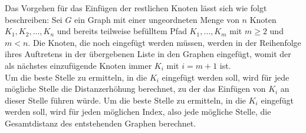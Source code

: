 
Das Vorgehen für das Einfügen der restlichen Knoten lässt sich wie folgt beschreiben: 
Sei $G$ ein Graph mit einer ungeordneten Menge von $n$ Knoten  $K_1,K_2,\ldots,K_n$ und bereits teilweise befülltem Pfad $K_1,\ldots,K_m$ mit $m \geq 2$ und $m < n$.
Die Knoten, die noch eingefügt werden müssen, werden in der Reihenfolge ihres Auftretens in der übergebenen Liste in den Graphen eingefügt, womit der als nächstes einzufügende Knoten immer $K_{i}$ mit $i = m + 1$ ist.
\\
Um die beste Stelle zu ermitteln, in die $K_i$ eingefügt werden soll, wird für jede mögliche Stelle die Distanzerhöhung berechnet, zu der das Einfügen von $K_i$ an dieser Stelle führen würde.
Um die beste Stelle zu ermitteln, in die $K_i$ eingefügt werden soll, wird für jeden möglichen Index, also jede mögliche Stelle, die Gesamtdistanz des entstehenden Graphen berechnet. 

